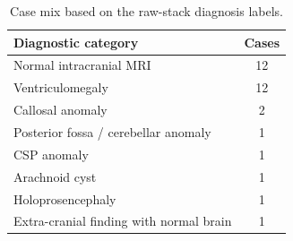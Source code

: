 \begin{table}[htbp]
\centering
\caption{Case mix based on the raw-stack diagnosis labels.}
\label{tab:cohort_distribution}
\begin{tabular}{lc}
\toprule
Diagnostic category & Cases \\
\midrule
Normal intracranial MRI & 12 \\
Ventriculomegaly & 12 \\
Callosal anomaly & 2 \\
Posterior fossa / cerebellar anomaly & 1 \\
CSP anomaly & 1 \\
Arachnoid cyst & 1 \\
Holoprosencephaly & 1 \\
Extra-cranial finding with normal brain & 1 \\
\bottomrule
\end{tabular}
\end{table}
